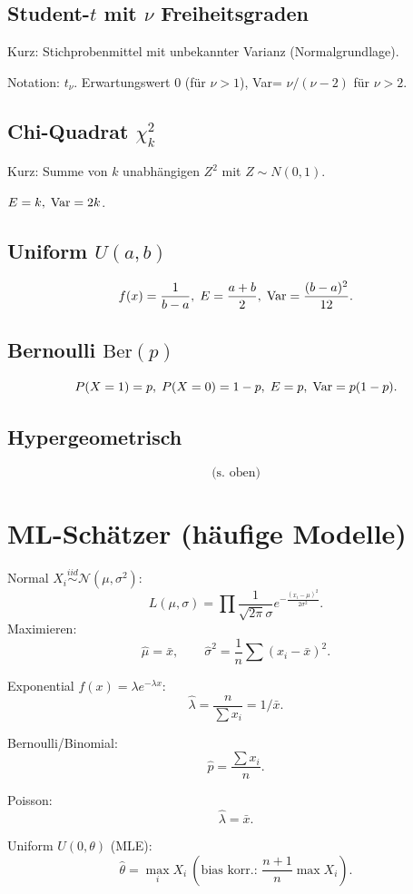 \documentclass[11pt,a4paper]{article}
\begin{document}
\subsection*{Student-$t$ mit $\nu$ Freiheitsgraden}
\begin{compactenum}
\item Kurz: Stichprobenmittel mit unbekannter Varianz (Normalgrundlage).
\item Notation: $t_\nu$. Erwartungswert $0$ (für $\nu>1$), Var= $\nu/(\nu-2)$ für $\nu>2$.
\end{compactenum}

\subsection*{Chi-Quadrat $\chi^2_k$}
\begin{compactenum}
\item Kurz: Summe von $k$ unabhängigen $Z^2$ mit $Z\sim N(0,1)$.
\item $E= k,\;\mathrm{Var}=2k$.
\end{compactenum}

\subsection*{Uniform $U(a,b)$}
\[f(x)=\frac{1}{b-a},\;E=\frac{a+b}{2},\;\mathrm{Var}=\frac{(b-a)^2}{12}.
\]

\subsection*{Bernoulli $\mathrm{Ber}(p)$}
\[P(X=1)=p,\;P(X=0)=1-p,\;E=p,\;\mathrm{Var}=p(1-p).
\]

\subsection*{Hypergeometrisch}
\[\text{(s. oben)}\]

\vspace{1ex}
\normalsize

\section*{ML-Schätzer (häufige Modelle)}
\small
\begin{compactenum}
\item Normal $X_i\stackrel{iid}{\sim}\mathcal N(\mu,\sigma^2)$:
\[L(\mu,\sigma)=\prod\frac{1}{\sqrt{2\pi}\sigma}e^{-\frac{(x_i-\mu)^2}{2\sigma^2}}.\]
Maximieren: \[\hat\mu=\bar x,\qquad \hat\sigma^2=\frac{1}{n}\sum (x_i-\bar x)^2.\]
\item Exponential $f(x)=\lambda e^{-\lambda x}$:\ \[\hat\lambda=\frac{n}{\sum x_i}=1/\bar x.\]
\item Bernoulli/Binomial: \[\hat p=\frac{\sum x_i}{n}.\]
\item Poisson: \[\hat\lambda=\bar x.\]
\item Uniform $U(0,\theta)$ (MLE): \[\hat\theta=\max_i X_i\ (\text{bias korr.: }\frac{n+1}{n}\max X_i).\]
\end{compactenum}
\normalsize
\end{document}
